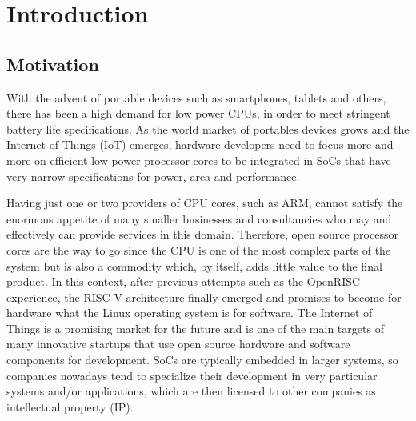 
\chapter{Introduction}
\label{chapter:introduction}


\section{Motivation}
\label{section:motivation}

With the advent of portable devices such as smartphones, tablets and others,
there has been a high demand for low power CPUs, in order to meet stringent
battery life specifications. As the world market of portables devices grows and
the Internet of Things (IoT) emerges, hardware developers need to focus more and more
on efficient low power processor cores to be integrated in SoCs that have very
narrow specifications for power, area and performance.

Having just one or two providers of CPU cores, such as ARM, cannot satisfy the
enormous appetite of many smaller businesses and consultancies who may and
effectively can provide services in this domain. Therefore, open source
processor cores are the way to go since the CPU is one of the most complex parts
of the system but is also a commodity which, by itself, adds little value to the
final product. In this context, after previous attempts such as the OpenRISC
experience, the RISC-V architecture finally emerged and promises to become for
hardware what the Linux operating system is for software. The Internet of Things
is a promising market for the future and is one of the main targets of many
innovative startups that use open source hardware and software components for
development. SoCs are typically embedded in larger systems, so companies
nowadays tend to specialize their development in very particular systems and/or
applications, which are then licensed to other companies as intellectual
property (IP).


